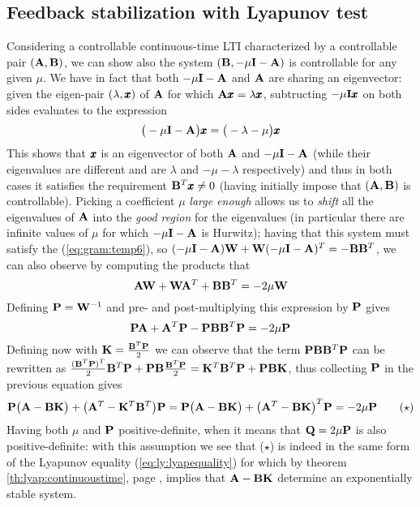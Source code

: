 \subsection{Feedback stabilization with Lyapunov test}
	Considering a controllable continuous-time LTI characterized by a controllable pair $(\A,\B)$, we can show also the system $(\B, -\mu\I - \A)$ is controllable for any given $\mu$. We have in fact that both $-\mu\I-\A$ and $\A$ are sharing an eigenvector: given the eigen-pair $(\lambda,\x)$ of $\A$ for which $\A\x = \lambda \x$, subtructing $-\mu \I\x$ on both sides evaluates to the expression
	\[ \big(-\mu \I - \A\big)  \x= \big(-\lambda - \mu\big) \x \]
	This shows that $\x$ is an eigenvector of both $\A$ and $-\mu \I - \A$ (while their eigenvalues are different and are $\lambda$ and $-\mu - \lambda$ respectively) and thus in both cases it satisfies the requirement $\B^T\x \neq 0$ (having initially impose that $(\A,\B)$ is controllable). Picking a coefficient $\mu$ \textit{large enough} allows us to \textit{shift} all the eigenvalues of $\A$ into the \textit{good region} for the eigenvalues (in particular there are infinite values of $\mu$ for which $-\mu \I - \A$ is Hurwitz); having that this system must satisfy the (\ref{eq:gram:temp6}), so $(-\mu \I - \A)\mat W + \mat W(-\mu\I - \A)^T = -\B \B^T$, we can also observe by computing the products that
	\[ \A \mat W + \mat W \A^T + \B\B^T = -2\mu \mat W \]
	Defining $\P = \mat W^{-1}$ and pre- and post-multiplying this expression by $\P$ gives
	\[ \P \A + \A^T \P - \P\B\B^T\P = -2\mu \P \]
	Defining now with $\K = \frac{\B^T\P}{2}$ we can observe that the term $\P\B\B^T\P$ can be rewritten as $\frac{(\B^T\P)^T}{2} \B^T\P + \P\B \frac{\B^T\P}{2} = \K^T \B^T \P + \P\B\K$, thus collecting $\P$ in the previous equation gives
	\[ \P\big(\A-\B\K\big) + \big(\A^T - \K^T\B^T\big) \P = \P\big(\A-\B\K\big) + \big(\A^T  -\B \K\big)^T \P = -2\mu \P \tag{$\star$} \]
	Having both $\mu$ and $\P$ positive-definite, when it means that $\Q=2\mu\P$ is also positive-definite: with this assumption we see that ($\star$) is indeed in the same form of the Lyapunov equality (\ref{eq:ly:lyapequality}) for which by theorem \ref{th:lyap:continuoustime}, page \pageref{th:lyap:continuoustime}, implies that $\A -\B\K$ determine an exponentially stable system. 
	
